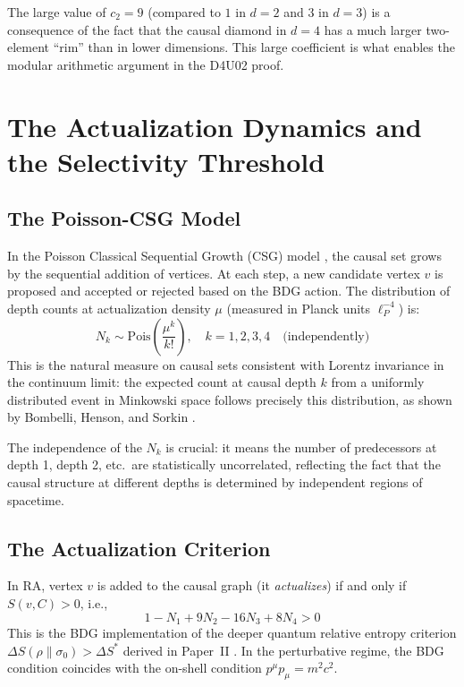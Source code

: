 \documentclass[12pt,a4paper]{article}
\begin{document}
The large value of $c_2=9$ (compared to $1$ in $d=2$ and $3$ in $d=3$) is a consequence of the fact that the causal diamond in $d=4$ has a much larger two-element ``rim'' than in lower dimensions.  This large coefficient is what enables the modular arithmetic argument in the D4U02 proof.


\section{The Actualization Dynamics and the Selectivity Threshold}\label{sec:dynamics}

\subsection{The Poisson-CSG Model}

In the Poisson Classical Sequential Growth (CSG) model \cite{Rideout2000}, the causal set grows by the sequential addition of vertices.  At each step, a new candidate vertex $v$ is proposed and accepted or rejected based on the BDG action.  The distribution of depth counts at actualization density $\mu$ (measured in Planck units $\ell_P^{-4}$) is:
\begin{equation}
  N_k \sim \mathrm{Pois}\!\left(\frac{\mu^k}{k!}\right), \quad k=1,2,3,4 \quad\text{(independently)}
  \label{eq:poisson_dist}
\end{equation}
This is the natural measure on causal sets consistent with Lorentz invariance in the continuum limit: the expected count at causal depth $k$ from a uniformly distributed event in Minkowski space follows precisely this distribution, as shown by Bombelli, Henson, and Sorkin \cite{Bombelli2009}.

The independence of the $N_k$ is crucial: it means the number of predecessors at depth 1, depth 2, etc.\ are statistically uncorrelated, reflecting the fact that the causal structure at different depths is determined by independent regions of spacetime.

\subsection{The Actualization Criterion}

In RA, vertex $v$ is added to the causal graph (it \emph{actualizes}) if and only if $S(v,C)>0$, i.e.,
\begin{equation}
  1 - N_1 + 9N_2 - 16N_3 + 8N_4 > 0
  \label{eq:criterion_BDG}
\end{equation}
This is the BDG implementation of the deeper quantum relative entropy criterion $\Delta S(\rho\|\sigma_0)>\Delta S^*$ derived in Paper~II \cite{RA_P2}.  In the perturbative regime, the BDG condition coincides with the on-shell condition $p^\mu p_\mu=m^2c^2$.
\end{document}
